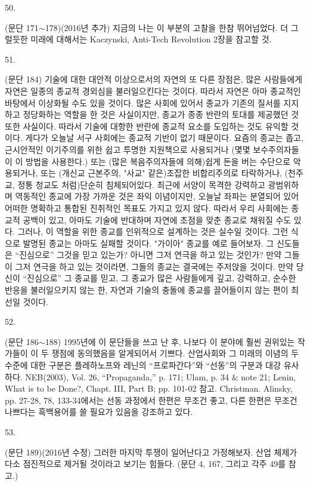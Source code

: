\documentclass[11pt,a4paper]{article}
\begin{document}
\begin{multicols}{2}
\hypertarget{50}{50.} (문단 171${\sim}$178)(2016년 추가) 지금의 나는 이 부분의 고찰을 한참 뛰어넘었다. 더 그럴듯한 미래에 대해서는 Kaczynski, Anti-Tech Revolution 2장을 참고할 것. 


\hypertarget{51}{51.} (문단 184) 기술에 대한 대안적 이상으로서의 자연의 또 다른 장점은, 많은 사람들에게 자연은  일종의 종교적 경외심을 불러일으킨다는 것이다. 따라서 자연은 아마 종교적인 바탕에서 이상화될 수도  있을 것이다. 많은 사회에 있어서 종교가 기존의 질서를 지지하고 정당화하는 역할을 한 것은 사실이지만,  종교가 종종 반란의 토대를 제공했던 것 또한 사실이다. 따라서 기술에 대항한 반란에 종교적 요소를  도입하는 것도 유익할 것이다. 게다가 오늘날 서구 사회에는 종교적 기반이 없기 때문이다. 요즘의 종교는 좁고, 근시안적인 이기주의를 위한 쉽고 투명한 지원책으로 사용되거나 (몇몇 보수주의자들이 이 방법을 사용한다.) 또는 (많은 복음주의자들에 의해)쉽게 돈을 버는 수단으로 악용되거나, 또는 (개신교 근본주의, "사교" 같은)조잡한 비합리주의로 타락하거나, (천주교, 정통 청교도 처럼)단순히 침체되어있다. 최근에 서양이 목격한 강력하고 광범위하며 역동적인 종교에 가장 가까운 것은 좌익 이념이지만, 오늘날 좌파는 분열되어 있어 어떠한 명확하고 통합된 진취적인 목표도 가지고 있지 않다. 따라서 우리 사회에는 종교적 공백이 있고, 아마도 기술에 반대하며 자연에 초점을 맞춘 종교로 채워질 수도 있다.  그러나, 이 역할을 위한 종교를 인위적으로 설계하는 것은 실수일 것이다. 그런 식으로 발명된 종교는  아마도 실패할 것이다. "가이아" 종교를 예로 들어보자. 그 신도들은 “진심으로” 그것을 믿고 있는가? 아니면 그저 연극을 하고 있는 것인가? 만약 그들이 그저 연극을 하고 있는 것이라면, 그들의 종교는  결국에는 주저앉을 것이다. 만약 당신이 “진심으로” 그 종교를 믿고, 그 종교가 많은 사람들에게 깊고,  강력하고, 순수한 반응을 불러일으키지 않는 한, 자연과 기술의 충돌에 종교를 끌어들이지 않는 편이  최선일 것이다. 


\hypertarget{52}{52.} (문단 186${\sim}$188) 1995년에 이 문단들을 쓰고 난 후, 나보다 이 분야에 훨씬 권위있는 작가들이 이  두 쟁점에 동의했음을 알게되어서 기쁘다. \textlangle{}산업사회와 그 미래\textrangle{}의 이념의 두 수준에 대한 구분은  플레하노프와 레닌의 “프로파간다”와 “선동”의 구분과 대강 유사하다. NEB(2003), Vol. 26,  “Propaganda,” p. 171; Ulam, p. 34 & note 21; Lenin, What is to be Done?, Chapt. III, Part B; pp. 101-02 참고. Christman. Alinsky, pp. 27-28, 78, 133-34에서는 선동 과정에서 한편은 무조건 좋고, 다른 한편은 무조건 나쁘다는 흑백용어를 쓸 필요가 있음을 강조하고 있다. 


\hypertarget{53}{53.} (문단 189)(2016년 수정) 그러한 마지막 투쟁이 일어난다고 가정해보자. 산업 체제가 다소 점진적으로 제거될 것이라고 보기는 힘들다. (문단 4, 167, 그리고 각주 49를 참고.)  



\end{multicols}
\end{document}
